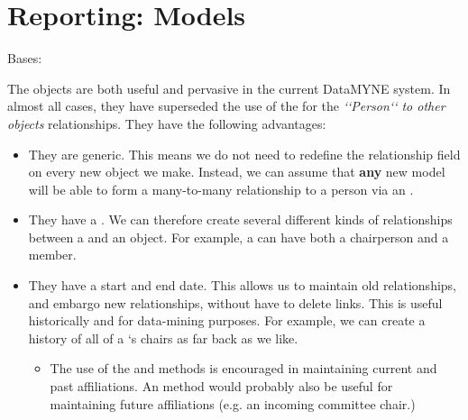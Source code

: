 \documentclass[letterpaper,10pt,english]{sphinxmanual}
\begin{document}
\chapter{Reporting: Models}
\label{generated/apps.reporting.models::doc}\label{generated/apps.reporting.models:reporting-models}\label{generated/apps.reporting.models:module-apps.reporting.models}

\begin{fulllineitems}
\label{generated/apps.reporting.models:apps.reporting.models.Affiliation}
Bases: 

The  objects are both useful and pervasive in the current DataMYNE
system.  In almost all cases, they have superseded the use of the 
for the \emph{{}`{}`Person{}`{}` to other objects} relationships.  They have the following
advantages:
\begin{itemize}
\item {} 
They are generic.  This means we do not need to redefine the relationship field on 
every new object we make.  Instead, we can assume that \textbf{any} new model will be 
able to form a many-to-many relationship to a person via an .

\item {} 
They have a .  We can therefore create several different kinds of
relationships between a  and an object.  For example, a 
can have both a chairperson and a member.

\item {} 
They have a start and end date.  This allows us to maintain old relationships,
and embargo new relationships, without have to delete links.  This is useful
historically and for data-mining purposes.  For example, we can create a history
of all of a `s chairs as far back as we like.
\begin{itemize}
\item {} 
The use of the  and  methods is encouraged in maintaining
current and past affiliations.  An  method would probably also be
useful for maintaining future affiliations (e.g. an incoming committee chair.)

\end{itemize}


\end{itemize}
\end{fulllineitems}
\end{document}
